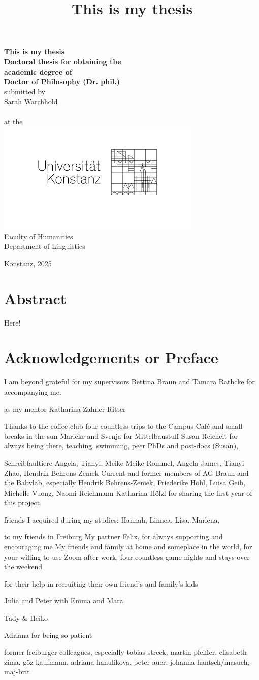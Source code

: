 \documentclass[
  11pt,
  a4paper,
  nottoc]{report}
\title{This is my thesis}
\date{}
\def\maketitle{
\pagenumbering{roman}
{\sf\thispagestyle{empty}%
\newgeometry{top=6cm,left=2cm,right=2cm,bottom=2.5cm}
\doublespacing
\sffamily
  \begin{center}\fontsize{18}{21.6}\sf
     \ul{\textbf{This is my thesis}}\\[2cm]
     \vfill
     {\fontsize{14}{16.8} \selectfont
      \textbf{Doctoral thesis for obtaining the\\
      academic degree of\\
      Doctor of Philosophy (Dr. phil.)}\\
      }
	\vspace{12mm}
  {\fontsize{12}{14.4} \selectfont
submitted by\\
Sarah Warchhold\\
\ \\
at the\\
}
\vspace{5mm}
\includegraphics{konstanz-logo}\\
\vspace{20mm}
{\fontsize{12}{14.4} \selectfont
	Faculty of Humanities\\
	Department of Linguistics
}
\end{center}
\vfill{}
Konstanz, 2025
\newpage\mbox{}\thispagestyle{empty}

\newpage
\restoregeometry
\rmfamily
}
}
\begin{document}
\maketitle

\linespread{1.5}
\setcounter{page}{1}  %

\chapter*{Abstract}\label{abstract}
Here!



\chapter*{Acknowledgements or Preface}\label{acknowledgements}


I am beyond grateful for my supervisors Bettina Braun and Tamara Rathcke for accompanying me.

as my mentor Katharina Zahner-Ritter

Thanks to the coffee-club four countless trips to the Campus Café and small breaks in the sun
Marieke and Svenja for Mittelbaustuff
Susan Reichelt for always being there, teaching, swimming,
peer PhDs and post-docs (Susan),

Schreibfaultiere Angela, Tianyi, Meike
Meike Rommel, Angela James, Tianyi Zhao, Hendrik Behrens-Zemek
Current and former members of AG Braun and the Babylab, especially Hendrik Behrens-Zemek, Friederike Hohl, Luisa Geib, Michelle Vuong, Naomi Reichmann
Katharina Hölzl for sharing the first year of this project

friends I acquired during my studies: Hannah, Linnea, Lisa, Marlena,

to my friends in Freiburg
My partner Felix, for always supporting and encouraging me
My friends and family at home and someplace in the world, for your willing to use Zoom after work, four countless game nights and stays over the weekend

for their help in recruiting their own friend's and family's kids

Julia and Peter with Emma and Mara


Tady \& Heiko

Adriana for being so patient


former freiburger colleagues, especially tobias streck, martin pfeiffer, elisabeth zima, göz kaufmann, adriana hanulikova, peter auer, johanna hantsch/masuch, maj-brit
\end{document}
